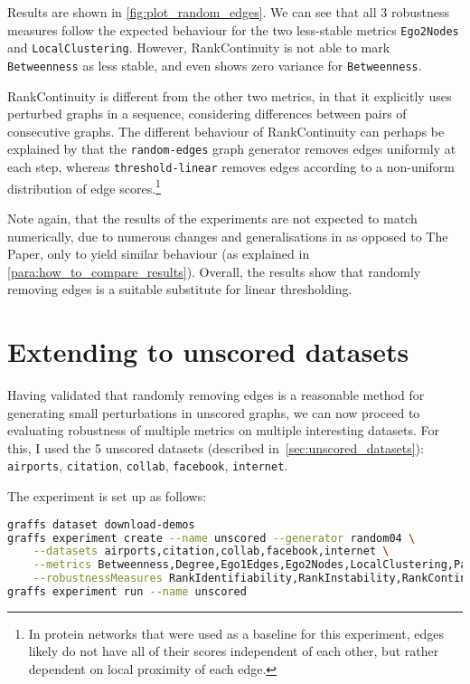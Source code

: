 

Results are shown in \autoref{fig:plot_random_edges}.
We can see that all 3 robustness measures follow the expected behaviour for the two less-stable metrics \texttt{Ego2Nodes} and \texttt{LocalClustering}.
However, RankContinuity is not able to mark \texttt{Betweenness} as less stable, and even shows zero variance for \texttt{Betweenness}.

RankContinuity is different from the other two metrics, in that it explicitly uses perturbed graphs in a sequence, considering differences between pairs of consecutive graphs.
The different behaviour of RankContinuity can perhaps be explained by that the \texttt{random-edges} graph generator removes edges uniformly at each step, whereas \texttt{threshold-linear} removes edges according to a non-uniform distribution of edge scores.\footnote{In protein networks that were used as a baseline for this experiment, edges likely do not have all of their scores independent of each other, but rather dependent on local proximity of each edge.}

Note again, that the results of the experiments are not expected to match numerically, due to numerous changes and generalisations in \graffs as opposed to The Paper, only to yield similar behaviour (as explained in \autoref{para:how_to_compare_results}).
Overall, the results show that randomly removing edges is a suitable substitute for linear thresholding.


\section{Extending to unscored datasets}

Having validated that randomly removing edges is a reasonable method for generating small perturbations in unscored graphs, we can now proceed to evaluating robustness of multiple metrics on multiple interesting datasets.
For this, I used the 5 unscored datasets (described in~\autoref{sec:unscored_datasets}): \texttt{airports}, \texttt{citation}, \texttt{collab}, \texttt{facebook}, \texttt{internet}.

The experiment is set up as follows:
\begin{lstlisting}[language=bash]
graffs dataset download-demos
graffs experiment create --name unscored --generator random04 \
    --datasets airports,citation,collab,facebook,internet \
    --metrics Betweenness,Degree,Ego1Edges,Ego2Nodes,LocalClustering,PageRank,Redundancy \
    --robustnessMeasures RankIdentifiability,RankInstability,RankContinuity
graffs experiment run --name unscored
\end{lstlisting}


